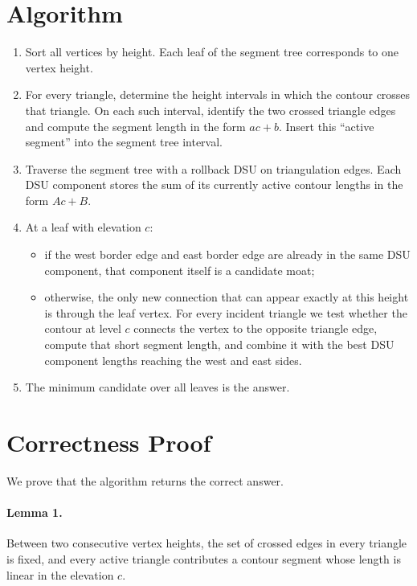 \documentclass[11pt]{article}
\begin{document}
\section*{Algorithm}

\begin{enumerate}[leftmargin=*]
    \item Sort all vertices by height. Each leaf of the segment tree corresponds to one vertex height.
    \item For every triangle, determine the height intervals in which the contour crosses that triangle.
    On each such interval, identify the two crossed triangle edges and compute the segment length in the
    form $a c + b$. Insert this ``active segment'' into the segment tree interval.
    \item Traverse the segment tree with a rollback DSU on triangulation edges.
    Each DSU component stores the sum of its currently active contour lengths in the form $A c + B$.
    \item At a leaf with elevation $c$:
    \begin{itemize}[leftmargin=*]
        \item if the west border edge and east border edge are already in the same DSU component, that
        component itself is a candidate moat;
        \item otherwise, the only new connection that can appear exactly at this height is through the leaf
        vertex.
        For every incident triangle we test whether the contour at level $c$ connects the vertex to the
        opposite triangle edge, compute that short segment length, and combine it with the best DSU
        component lengths reaching the west and east sides.
    \end{itemize}
    \item The minimum candidate over all leaves is the answer.
\end{enumerate}

\section*{Correctness Proof}

We prove that the algorithm returns the correct answer.

\paragraph{Lemma 1.}
Between two consecutive vertex heights, the set of crossed edges in every triangle is fixed, and every
active triangle contributes a contour segment whose length is linear in the elevation $c$.
\end{document}
